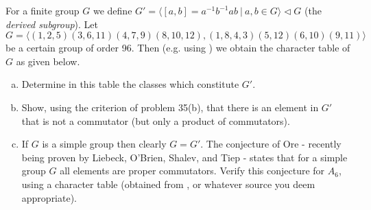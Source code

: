 \documentclass[leqno]{article}
\begin{document}
\newpage
\begin{problem}
For a finite group $G$ we define $G'=\langle [a,b]=a^{-1}b^{-1}ab~\vert~a,b\in G\rangle \lhd G$ (the \emph{derived subgroup}). Let $G = \langle (1,2,5)(3,6,11)(4,7,9)(8,10,12),(1,8,4,3)(5,12)(6,10)(9,11)\rangle$ be a certain group of order 96. Then (e.g. using \GAP) we obtain the character table of $G$ as given below.
\begin{enumerate}[(a)]
    \item Determine in this table the classes which constitute $G'$.
    \item Show, using the criterion of problem 35(b), that there is an element in $G'$ that is not a commutator (but only a product of commutators).
    \item If $G$ is a simple group then clearly $G=G'$. The conjecture of Ore - recently being proven by Liebeck, O'Brien, Shalev, and Tiep - states that for a simple group $G$ all elements are proper commutators. Verify this conjecture for $A_6$, using a character table (obtained from \GAP, or whatever source you deem appropriate).
\end{enumerate}
\end{problem}
\end{document}

